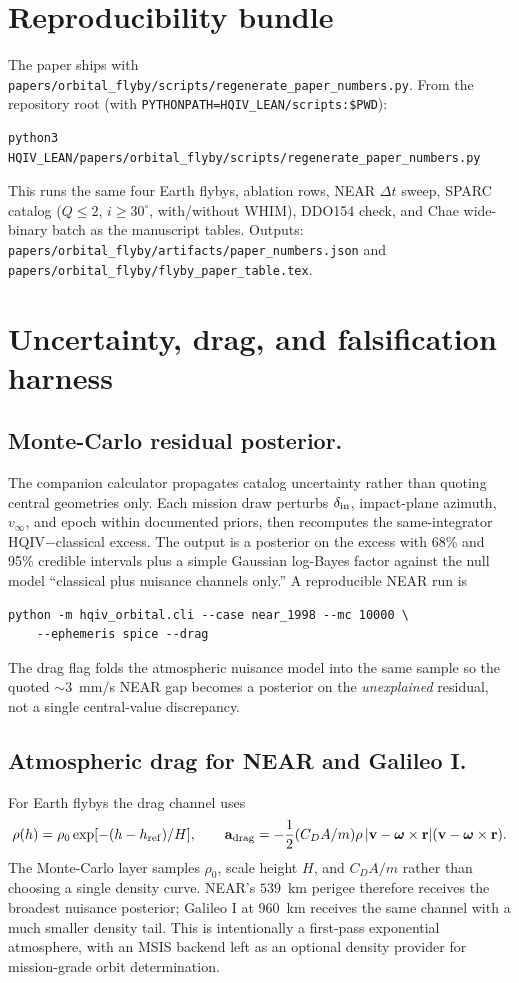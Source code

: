 \documentclass[11pt]{amsart}
\begin{document}
\section{Reproducibility bundle}\label{sec:repro}

The paper ships with \texttt{papers/orbital\_flyby/scripts/regenerate\_paper\_numbers.py}.
From the repository root (with \texttt{PYTHONPATH=HQIV\_LEAN/scripts:\$PWD}):
\begin{verbatim}
python3 HQIV_LEAN/papers/orbital_flyby/scripts/regenerate_paper_numbers.py
\end{verbatim}
This runs the same four Earth flybys, ablation rows, NEAR $\Delta t$ sweep, SPARC catalog
($Q\le 2$, $i\ge 30^\circ$, with/without WHIM), DDO154 check, and Chae wide-binary batch
as the manuscript tables. Outputs:
\texttt{papers/orbital\_flyby/artifacts/paper\_numbers.json} and
\texttt{papers/orbital\_flyby/flyby\_paper\_table.tex}.

\section{Uncertainty, drag, and falsification harness}\label{sec:posterior}

\subsection{Monte-Carlo residual posterior.}
The companion calculator propagates catalog uncertainty rather than quoting central
geometries only. Each mission draw perturbs $\delta_{\rm in}$, impact-plane azimuth,
$v_\infty$, and epoch within documented priors, then recomputes the same-integrator
HQIV$-$classical excess. The output is a posterior on the excess with 68\% and 95\%
credible intervals plus a simple Gaussian log-Bayes factor against the null model
``classical plus nuisance channels only.'' A reproducible NEAR run is
\begin{verbatim}
python -m hqiv_orbital.cli --case near_1998 --mc 10000 \
    --ephemeris spice --drag
\end{verbatim}
The drag flag folds the atmospheric nuisance model into the same sample so the quoted
$\sim 3$~mm/s NEAR gap becomes a posterior on the \emph{unexplained} residual, not a single
central-value discrepancy.

\subsection{Atmospheric drag for NEAR and Galileo I.}
For Earth flybys the drag channel uses
\[
  \rho(h)=\rho_0\exp[-(h-h_{\rm ref})/H],\qquad
  \mathbf a_{\rm drag}=-\frac12(C_DA/m)\rho\,|\mathbf v-\boldsymbol\omega\times\mathbf r|
  (\mathbf v-\boldsymbol\omega\times\mathbf r).
\]
The Monte-Carlo layer samples $\rho_0$, scale height $H$, and $C_DA/m$ rather than choosing a
single density curve. NEAR's $539$~km perigee therefore receives the broadest nuisance
posterior; Galileo I at $960$~km receives the same channel with a much smaller density tail.
This is intentionally a first-pass exponential atmosphere, with an MSIS backend left as an
optional density provider for mission-grade orbit determination.
\end{document}
